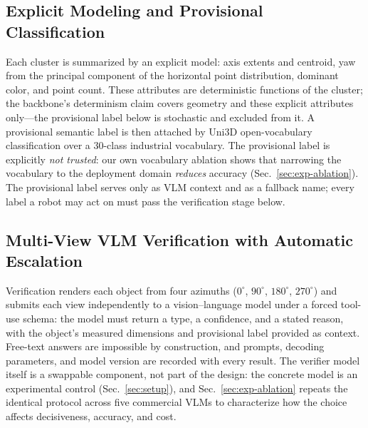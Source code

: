 \subsection{Explicit Modeling and Provisional Classification}
\label{sec:explicit}

Each cluster is summarized by an explicit model: axis extents and centroid,
yaw from the principal component of the horizontal point distribution,
dominant color, and point count. These attributes are deterministic functions
of the cluster; the backbone's determinism claim covers geometry and these
explicit attributes only---the provisional label below is stochastic and
excluded from it. A provisional semantic label is then attached by Uni3D
open-vocabulary classification over a 30-class industrial vocabulary. The
provisional label is explicitly \emph{not trusted}: our own vocabulary
ablation shows that narrowing the vocabulary to the deployment
domain \emph{reduces} accuracy (Sec.~\ref{sec:exp-ablation}). The
provisional label serves only as VLM context and as a fallback name; every
label a robot may act on must pass the verification stage below.

\subsection{Multi-View VLM Verification with Automatic Escalation}
\label{sec:verification}

Verification renders each object from four azimuths ($0^{\circ}$,
$90^{\circ}$, $180^{\circ}$, $270^{\circ}$) and submits each view
independently to a vision--language model under a forced tool-use
schema: the model must return a type, a confidence, and a stated reason, with
the object's measured dimensions and provisional label provided as context.
Free-text answers are impossible by construction, and prompts, decoding
parameters, and model version are recorded with every result. The verifier
model itself is a swappable component, not part of the design: the concrete
model is an experimental control (Sec.~\ref{sec:setup}), and Sec.~\ref{sec:exp-ablation} repeats the
identical protocol across five commercial VLMs to characterize how the
choice affects decisiveness, accuracy, and cost.

